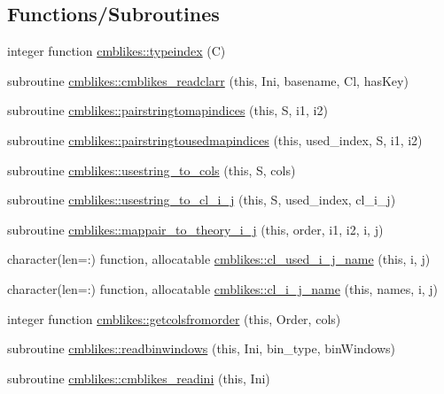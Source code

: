 \subsection*{Functions/\+Subroutines}
\begin{DoxyCompactItemize}
\item 
integer function \mbox{\hyperlink{namespacecmblikes_a957c1b188c2225799d8fb439858c73d6}{cmblikes\+::typeindex}} (C)
\item 
subroutine \mbox{\hyperlink{namespacecmblikes_ae22eb6439b51b993d560298fa0c2ebd8}{cmblikes\+::cmblikes\+\_\+readclarr}} (this, Ini, basename, Cl, has\+Key)
\item 
subroutine \mbox{\hyperlink{namespacecmblikes_a41e3ac813ae7de0d8a76ffdd669077f1}{cmblikes\+::pairstringtomapindices}} (this, S, i1, i2)
\item 
subroutine \mbox{\hyperlink{namespacecmblikes_af5bfde8e9716fa2038de9aec00e88699}{cmblikes\+::pairstringtousedmapindices}} (this, used\+\_\+index, S, i1, i2)
\item 
subroutine \mbox{\hyperlink{namespacecmblikes_a6ccd97b88f377eae282aaa60c1661b49}{cmblikes\+::usestring\+\_\+to\+\_\+cols}} (this, S, cols)
\item 
subroutine \mbox{\hyperlink{namespacecmblikes_aacd5ae93afb3acb0e509842bbfeb7e4e}{cmblikes\+::usestring\+\_\+to\+\_\+cl\+\_\+i\+\_\+j}} (this, S, used\+\_\+index, cl\+\_\+i\+\_\+j)
\item 
subroutine \mbox{\hyperlink{namespacecmblikes_a160df8f7d35a11fb589fee16adc7675b}{cmblikes\+::mappair\+\_\+to\+\_\+theory\+\_\+i\+\_\+j}} (this, order, i1, i2, i, j)
\item 
character(len=\+:) function, allocatable \mbox{\hyperlink{namespacecmblikes_aed345a121b78d08d7aa703636785f56b}{cmblikes\+::cl\+\_\+used\+\_\+i\+\_\+j\+\_\+name}} (this, i, j)
\item 
character(len=\+:) function, allocatable \mbox{\hyperlink{namespacecmblikes_a44a1c6a75608d89a037ffc9ea4571aa3}{cmblikes\+::cl\+\_\+i\+\_\+j\+\_\+name}} (this, names, i, j)
\item 
integer function \mbox{\hyperlink{namespacecmblikes_a114579c77c600f40b2354a47106bde81}{cmblikes\+::getcolsfromorder}} (this, Order, cols)
\item 
subroutine \mbox{\hyperlink{namespacecmblikes_a44827afcb3b8cf727e566cb8919f7e0e}{cmblikes\+::readbinwindows}} (this, Ini, bin\+\_\+type, bin\+Windows)
\item 
subroutine \mbox{\hyperlink{namespacecmblikes_a0a856ee69d8586f1b224e56f86016346}{cmblikes\+::cmblikes\+\_\+readini}} (this, Ini)

\end{DoxyCompactItemize}

